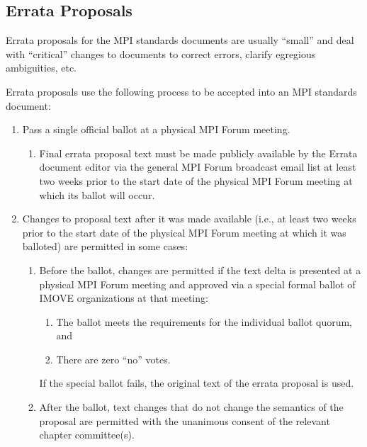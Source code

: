 
\subsection{Errata Proposals}

Errata proposals for the MPI standards documents are usually ``small''
and deal with ``critical'' changes to documents to correct errors,
clarify egregious ambiguities, etc.

Errata proposals use the following process to be accepted into an MPI
standards document:

\begin{enumerate}

\item Pass a single official ballot at a physical MPI Forum meeting.
  \begin{enumerate}
  \item Final errata proposal text must be made publicly available by
    the Errata document editor via the general MPI Forum broadcast
    email list at least two weeks prior to the start date of the
    physical MPI Forum meeting at which its ballot will occur.
  \end{enumerate}

\item Changes to proposal text after it was made available (i.e., at
  least two weeks prior to the start date of the physical MPI Forum
  meeting at which it was balloted) are permitted in some cases:
  \begin{enumerate}
  \item Before the ballot, changes are permitted if the text delta is
    presented at a physical MPI Forum meeting and approved via a
    special formal ballot of IMOVE organizations at that meeting:
    \begin{enumerate}
    \item The ballot meets the requirements for the individual
      ballot quorum, and
    \item There are zero ``no'' votes.
    \end{enumerate}
    
    If the special ballot fails, the original text of the errata
    proposal is used.
  \item After the ballot, text changes that do not change the
    semantics of the proposal are permitted with the unanimous consent
    of the relevant chapter committee(s).
  \end{enumerate}
\end{enumerate}


